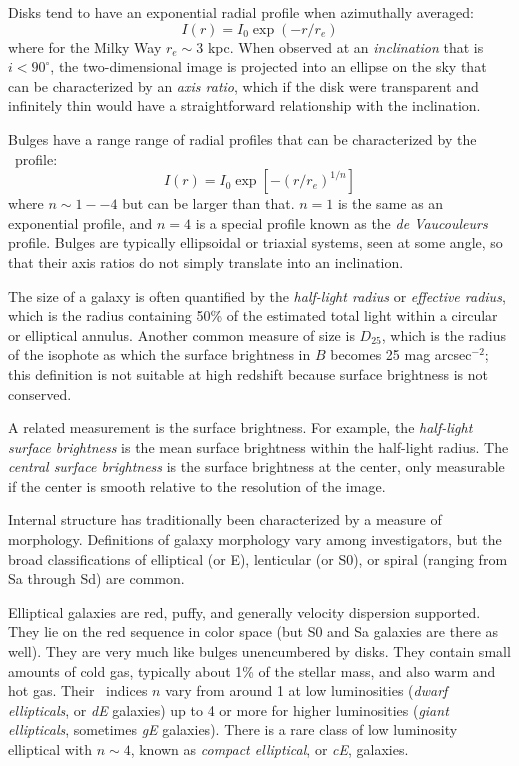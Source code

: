 Disks tend to have an exponential radial profile when azimuthally
averaged:
\begin{equation}
I(r) = I_0 \exp\left(- r / r_e\right)
\end{equation}
where for the Milky Way $r_e \sim 3$ kpc. When observed at an {\it
inclination} that is $i<90^\circ$, the two-dimensional image is
projected into an ellipse on the sky that can be characterized by an
{\it axis ratio}, which if the disk were transparent and infinitely
thin would have a straightforward relationship with the inclination.

Bulges have a range range of radial profiles that can be characterized
by the \Sersic\ profile:
\begin{equation}
I(r) = I_0 \exp\left[- \left(r / r_e\right)^{1/n}\right]
\end{equation}
where $n \sim 1--4$ but can be larger than that. $n=1$ is the same as
an exponential profile, and $n=4$ is a special profile known as the
{\it de Vaucouleurs} profile. Bulges are typically ellipsoidal or
triaxial systems, seen at some angle, so that their axis ratios do not
simply translate into an inclination.

The size of a galaxy is often quantified by the {\it half-light
radius} or {\it effective radius}, which is the radius containing 50\%
of the estimated total light within a circular or elliptical
annulus. Another common measure of size is $D_{25}$, which is the
radius of the isophote as which the surface brightness in $B$ becomes
25 mag arcsec$^{-2}$; this definition is not suitable at high redshift
because surface brightness is not conserved.

A related measurement is the surface brightness. For example, the {\it
half-light surface brightness} is the mean surface brightness within
the half-light radius. The {\it central surface brightness} is the
surface brightness at the center, only measurable if the center is
smooth relative to the resolution of the image.

Internal structure has traditionally been characterized by a measure
of morphology. Definitions of galaxy morphology vary among
investigators, but the broad classifications of elliptical (or E),
lenticular (or S0), or spiral (ranging from Sa through Sd) are common.

Elliptical galaxies are red, puffy, and generally velocity dispersion
supported. They lie on the red sequence in color space (but S0 and Sa
galaxies are there as well). They are very much like bulges
unencumbered by disks. They contain small amounts of cold gas,
typically about 1\% of the stellar mass, and also warm and hot
gas. Their \Sersic\ indices $n$ vary from around 1 at low luminosities
({\it dwarf ellipticals}, or {\it dE} galaxies) up to 4 or more for
higher luminosities ({\it giant ellipticals}, sometimes {\it gE}
galaxies).  There is a rare class of low luminosity elliptical with
$n\sim 4$, known as {\it compact elliptical}, or {\it cE}, galaxies.


